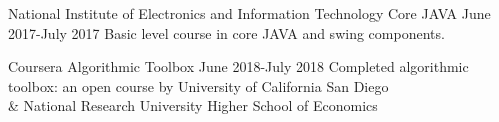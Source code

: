 
\begin{entryzlist}
\entryz

{National Institute of Electronics and Information Technology {\normalfont  Core JAVA }}
{June 2017-July 2017}
{\small Basic level course in core JAVA and swing components.}

\entryz

{Coursera {\normalfont  Algorithmic Toolbox }}
{June 2018-July 2018}
{\small Completed algorithmic toolbox: an open course by University of California San Diego 
\\
\& National Research University Higher School of Economics}


\end{entryzlist}